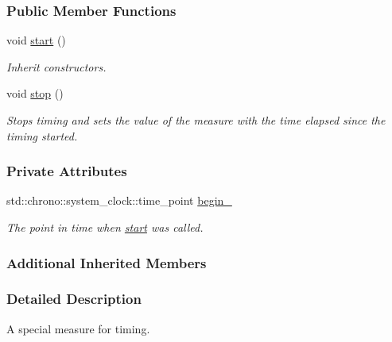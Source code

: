 \subsubsection*{Public Member Functions}
\begin{DoxyCompactItemize}
\item 
void \hyperlink{structTimer_a3a8b5272198d029779dc9302a54305a8}{start} ()
\begin{DoxyCompactList}\small\item\em Inherit constructors. \end{DoxyCompactList}\item 
void \hyperlink{structTimer_a63f0eb44b27402196590a03781515dba}{stop} ()\hypertarget{structTimer_a63f0eb44b27402196590a03781515dba}{}\label{structTimer_a63f0eb44b27402196590a03781515dba}

\begin{DoxyCompactList}\small\item\em Stops timing and sets the value of the measure with the time elapsed since the timing started. \end{DoxyCompactList}\end{DoxyCompactItemize}
\subsubsection*{Private Attributes}
\begin{DoxyCompactItemize}
\item 
std\+::chrono\+::system\+\_\+clock\+::time\+\_\+point \hyperlink{structTimer_a7969f096945054e1105b498665898320}{begin\+\_\+}\hypertarget{structTimer_a7969f096945054e1105b498665898320}{}\label{structTimer_a7969f096945054e1105b498665898320}

\begin{DoxyCompactList}\small\item\em The point in time when \hyperlink{structTimer_a3a8b5272198d029779dc9302a54305a8}{start} was called. \end{DoxyCompactList}\end{DoxyCompactItemize}
\subsubsection*{Additional Inherited Members}


\subsubsection{Detailed Description}
A special measure for timing. 

